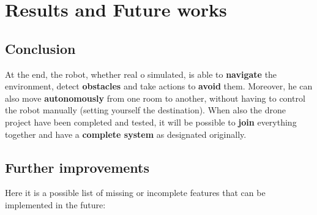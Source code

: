 \chapter{Results and Future works}
\label{cha:futureworks} %

\section{Conclusion}

At the end, the robot, whether real o simulated, is able to \textbf{navigate} the environment, detect \textbf{obstacles} and take actions to \textbf{avoid} them. Moreover, he can also move \textbf{autonomously} from one room to another, without having to control the robot manually (setting yourself the destination). When also the drone project have been completed and tested, it will be possible to \textbf{join} everything together and have a \textbf{complete system} as designated originally.

\section{Further improvements}

Here it is a possible list of missing or incomplete features that can be implemented in the future:

